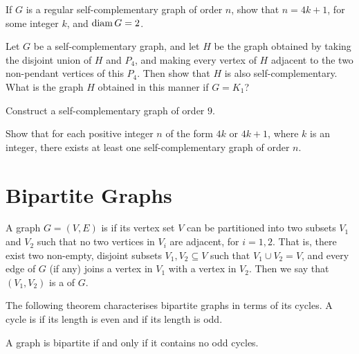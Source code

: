 \begin{Exercise}
If $G$ is a regular self-complementary graph of order $n$, show that $n = 4k + 1$, for some integer $k$, and $\operatorname{diam} G = 2$.
\end{Exercise}

\begin{Exercise}
Let $G$ be a self-complementary graph, and let $H$ be the graph obtained by taking the disjoint union of $H$ and $P_4$, and making every vertex of $H$ adjacent to the two non-pendant vertices of this $P_4$. Then show that $H$ is also self-complementary. What is the graph $H$ obtained in this manner if $G = K_1$?
\end{Exercise}

\begin{Exercise}
Construct a self-complementary graph of order $9$.
\end{Exercise}

\begin{Exercise}
Show that for each positive integer $n$ of the form $4k$ or $4k + 1$, where $k$ is an integer, there exists at least one self-complementary graph of order $n$.
\end{Exercise}


\section{Bipartite Graphs}\label{sec:Bipartite}

A graph $G = (V, E)$ is  if its vertex set $V$ can be partitioned into two subsets $V_1$ and $V_2$ such that no two vertices in $V_i$ are adjacent, for $i = 1, 2$. That is, there exist two non-empty, disjoint subsets $V_1, V_2 \subseteq V$ such that $V_1 \cup V_2 = V$, and every edge of $G$ (if any) joins a vertex in $V_1$ with a vertex in $V_2$. Then we say that $(V_1, V_2)$ is a  of $G$.

The following theorem characterises bipartite graphs in terms of its cycles. A cycle is  if its length is even and  if its length is odd.

\begin{Theorem}
A graph is bipartite if and only if it contains no odd cycles.
\end{Theorem}

